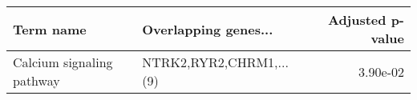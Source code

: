 \begin{tabular}{llr}
\toprule
                Term name &    Overlapping genes... &  Adjusted p-value \\
\midrule
Calcium signaling pathway & NTRK2,RYR2,CHRM1,...(9) &          3.90e-02 \\
\bottomrule
\end{tabular}
